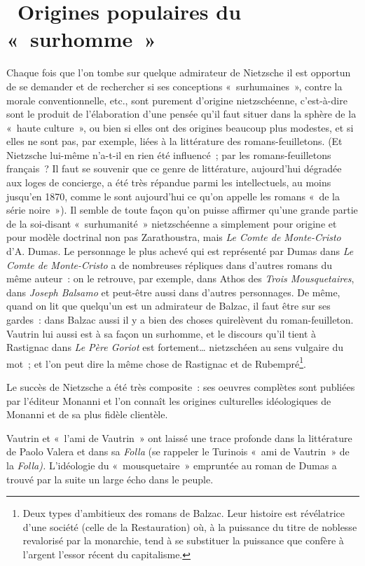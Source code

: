 \documentclass[french,twoside]{book} %
\begin{document}
\section[{ Origines populaires du « surhomme »}]{ Origines populaires du « surhomme » }
\noindent Chaque fois que l’on tombe sur quelque admirateur de Nietzsche il est opportun de se demander et de rechercher si ses conceptions « surhumaines », contre la morale conventionnelle, etc., sont purement d’origine nietzschéenne, c’est-à-dire sont le produit de l’élaboration d’une pensée qu’il faut situer dans la sphère de la « haute culture », ou bien si elles ont des origines beaucoup plus modestes, et si elles ne sont pas, par exemple, liées à la littérature des romans-feuilletons. (Et Nietzsche lui-même n’a-t-il en rien été influencé ; par les romans-feuilletons français ? Il faut se souvenir que ce genre de littérature, aujourd’hui dégradée aux loges de concierge, a été très répandue parmi les intellectuels, au moins jusqu’en 1870, comme le sont aujourd’hui ce qu’on appelle les romans « de la série noire »). Il semble de toute façon qu’on puisse affirmer qu’une grande partie de la soi-disant « surhumanité » nietzschéenne a simplement pour origine et pour modèle doctrinal non pas Zarathoustra, mais \emph{Le Comte de Monte-Cristo} d’A. Dumas. Le personnage le plus achevé qui est représenté par Dumas dans \emph{Le Comte de Monte-Cristo} a de nombreuses répliques dans d’autres romans du même auteur : on le retrouve, par exemple, dans Athos des \emph{Trois Mousquetaires}, dans \emph{Joseph Balsamo} et peut-être aussi dans d’autres personnages. De même, quand on lit que quelqu’un est un admirateur de Balzac, il faut être sur ses gardes : dans Balzac aussi il y a bien des choses quirelèvent du roman-feuilleton. Vautrin lui aussi est à sa façon un surhomme, et le discours qu’il tient à Rastignac dans \emph{Le Père Goriot} est fortement… nietzschéen au sens vulgaire du mot ; et l’on peut dire la même chose de Rastignac et de Rubempré\footnote{Deux types d’ambitieux des romans de Balzac. Leur histoire est révélatrice d’une société (celle de la Restauration) où, à la puissance du titre de noblesse revalorisé par la monarchie, tend à se substituer la puissance que confère à l’argent l’essor récent du capitalisme.}.\par
Le succès de Nietzsche a été très composite : ses oeuvres complètes sont publiées par l’éditeur Monanni et l’on connaît les origines culturelles idéologiques de Monanni et de sa plus fidèle clientèle.\par
Vautrin et « l’ami de Vautrin » ont laissé une trace profonde dans la littérature de Paolo Valera et dans sa \emph{Folla} (se rappeler le Turinois « ami de Vautrin » de la \emph{Folla).} L'idéologie du « mousquetaire » empruntée au roman de Dumas a trouvé par la suite un large écho dans le peuple.\par
\end{document}
